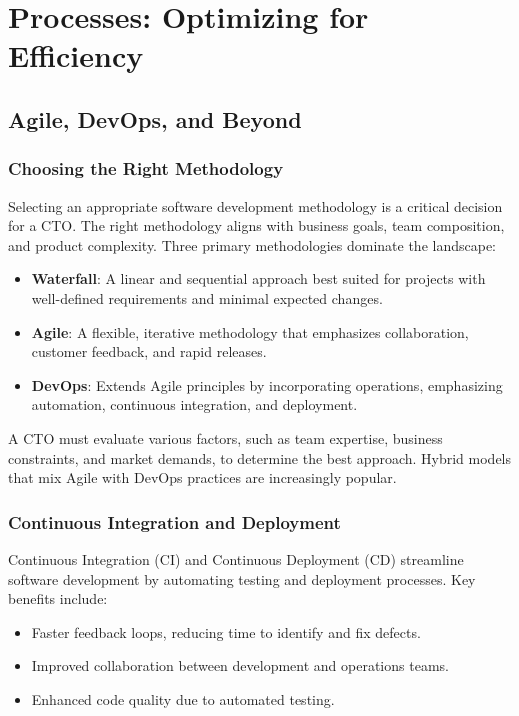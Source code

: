 \chapter{Processes: Optimizing for Efficiency}

\section{Agile, DevOps, and Beyond}

\subsection{Choosing the Right Methodology}
Selecting an appropriate software development methodology is a critical decision for a CTO. The right methodology aligns with business goals, team composition, and product complexity. Three primary methodologies dominate the landscape:

\begin{itemize}
    \item \textbf{Waterfall}: A linear and sequential approach best suited for projects with well-defined requirements and minimal expected changes.
    \item \textbf{Agile}: A flexible, iterative methodology that emphasizes collaboration, customer feedback, and rapid releases.
    \item \textbf{DevOps}: Extends Agile principles by incorporating operations, emphasizing automation, continuous integration, and deployment.
\end{itemize}

A CTO must evaluate various factors, such as team expertise, business constraints, and market demands, to determine the best approach. Hybrid models that mix Agile with DevOps practices are increasingly popular.

\subsection{Continuous Integration and Deployment}
Continuous Integration (CI) and Continuous Deployment (CD) streamline software development by automating testing and deployment processes. Key benefits include:

\begin{itemize}
    \item Faster feedback loops, reducing time to identify and fix defects.
    \item Improved collaboration between development and operations teams.
    \item Enhanced code quality due to automated testing.
\end{itemize}

